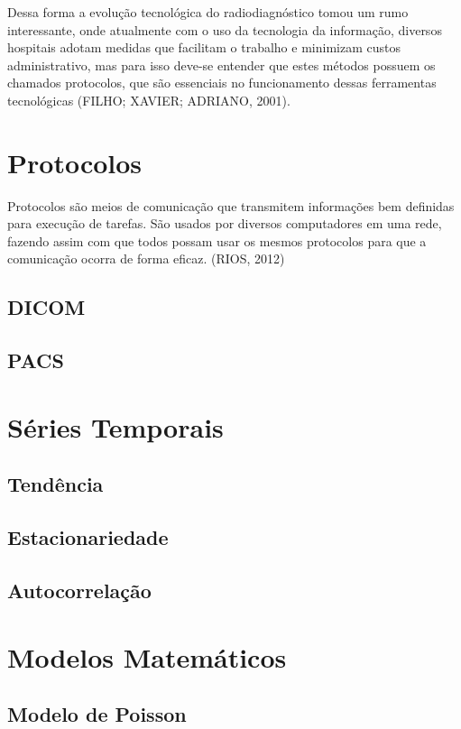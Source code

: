 \documentclass[
	12pt,				%
	openright,			%
	twoside,			%
	a4paper,			%
	english,			%
	french,				%
	spanish,			%
	brazil				%
	]{abntex2}
\begin{document}
Dessa forma a evolução tecnológica do radiodiagnóstico tomou um rumo interessante, onde atualmente com o uso da tecnologia da informação, diversos hospitais adotam medidas que facilitam o trabalho e minimizam custos administrativo, mas para isso deve-se entender que estes métodos possuem os chamados protocolos, que são essenciais no funcionamento dessas ferramentas tecnológicas (FILHO; XAVIER; ADRIANO, 2001).

\section{Protocolos}
Protocolos são meios de comunicação que transmitem informações bem definidas para execução de tarefas. São usados por diversos computadores em uma rede, fazendo assim com que todos possam usar os mesmos protocolos para que a comunicação ocorra de forma eficaz. (RIOS, 2012)

\subsection{DICOM}

\subsection{PACS}

\section{Séries Temporais}

\subsection{Tendência}
\subsection{Estacionariedade}
\subsection{Autocorrelação}

\section{Modelos Matemáticos}

\subsection{Modelo de Poisson}
\end{document}
